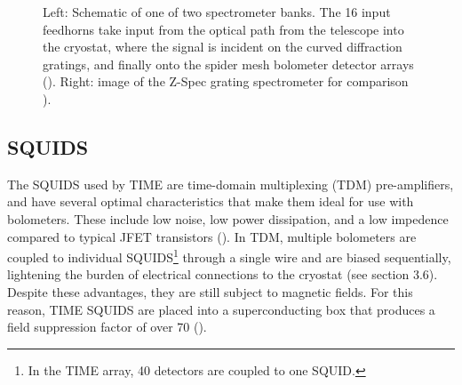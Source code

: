 \documentclass[manuscript]{aastex}
\begin{document}
\begin{figure}[H]%
    \centering
    \qquad
    \singlespace
    \caption[TIME Spectrometer Banks and Detector Modules -(\cite{Hunacek2016})]{Left: Schematic of one of two spectrometer banks. The 16 input feedhorns take input from the optical path from the telescope into the cryostat, where the signal is incident on the curved diffraction gratings, and finally onto the spider mesh bolometer detector arrays (\cite{Hunacek2016}). Right: image of the Z-Spec grating spectrometer for comparison \cite{Crites2014}).}%
    \label{fig:jon2}%
    \vspace{-0.8cm}
\end{figure}
\subsection{SQUIDS}

The SQUIDS used by TIME are time-domain multiplexing (TDM) pre-amplifiers, and have several optimal characteristics that make them ideal for use with bolometers. These include low noise, low power dissipation, and a low impedence compared to typical JFET transistors (\cite{Dobbs2009}). In TDM, multiple bolometers are coupled to individual SQUIDS\footnote{In the TIME array, 40 detectors are coupled to one SQUID.} through a single wire and are biased sequentially, lightening the burden of electrical connections to the cryostat (see section 3.6). Despite these advantages, they are still subject to magnetic fields. For this reason, TIME SQUIDS are placed into a superconducting box that produces a field suppression factor of over 70 (\cite{Hunacek2016b}).
\end{document}
